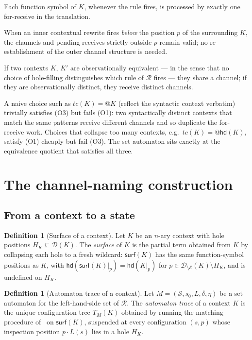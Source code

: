 \documentclass[11pt]{article}
\theoremstyle{plain}
\theoremstyle{definition}
\newtheorem{definition}[theorem]{Definition}
\theoremstyle{remark}
\newcommand{\States}{\mathcal{S}}
\newcommand{\hd}{\mathsf{hd}}
\newcommand{\dom}{\mathcal{D}}
\newcommand{\edges}{\mathcal{E}}
\newcommand{\surface}{\mathsf{surf}}
\begin{document}
\begin{description}[leftmargin=*]
  \item[(O1) Symbol-once.] Each function symbol of $K$, whenever the rule fires,
        is processed by exactly one \textsf{for}-receive in the translation.
  \item[(O2) Prune-preserves.] When an inner contextual rewrite fires
        \emph{below} the position $p$ of the surrounding $K$, the channels
        and pending receives strictly outside $p$ remain valid; no
        re-establishment of the outer channel structure is needed.
  \item[(O3) Coarsest sound.] If two contexts $K$, $K'$ are
        observationally equivalent --- in the sense that no choice of
        hole-filling distinguishes which rule of $\mathcal{R}$ fires --- they
        share a channel; if they are observationally distinct, they receive
        distinct channels.
\end{description}

A naive choice such as $tc(K) = @K$ (reflect the syntactic context
verbatim) trivially satisfies (O3) but fails (O1): two syntactically distinct
contexts that match the same patterns receive different channels and so
duplicate the for-receive work. Choices that collapse too many contexts,
e.g.\ $tc(K) = @\hd(K)$, satisfy (O1) cheaply but fail (O3). The set
automaton sits exactly at the equivalence quotient that satisfies all
three.

\section{The channel-naming construction}\label{sec:construction}

\subsection{From a context to a state}

\begin{definition}[Surface of a context]\label{def:surface}
Let $K$ be an $n$-ary context with hole positions $H_{K} \subseteq \dom(K)$.
The \emph{surface} of $K$ is the partial term obtained from $K$ by
collapsing each hole to a fresh wildcard: $\surface(K)$ has the same
function-symbol positions as $K$, with $\hd(\surface(K)|_{p}) = \hd(K|_{p})$
for $p \in \dom_{\setminus\edges}(K) \setminus H_{K}$, and is undefined on
$H_{K}$.
\end{definition}

\begin{definition}[Automaton trace of a context]\label{def:trace}
Let $M = (\States, s_{0}, L, \delta, \eta)$ be a set automaton for the
left-hand-side set of $\mathcal{R}$. The \emph{automaton trace} of a context
$K$ is the unique configuration tree $T_{M}(K)$ obtained by running the
matching procedure of~\cite[\S 3]{BouwmanErkens2022} on $\surface(K)$,
suspended at every configuration $(s, p)$ whose inspection position
$p \cdot L(s)$ lies in a hole $H_{K}$.
\end{definition}
\end{document}

